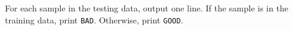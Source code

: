 For each sample in the testing data, output one line.
If the sample is in the training data, print \verb+BAD+.
Otherwise, print \verb+GOOD+.
